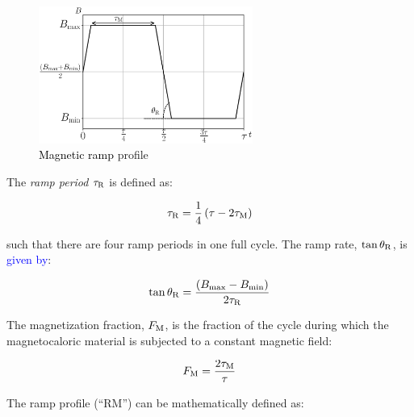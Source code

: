 \documentclass[referee]{svjour3}
\begin{document}
\begin{figure}[!ht]
  \centering
  \includegraphics[width=7cm]{Fig4-profile_rm}
  \caption{\textcolor{black}{Magnetic ramp}  profile}
  \label{fig:ramp}
\end{figure}

The \emph{ramp period} \(\tau_{\mathrm{R}}\) is defined as:

\begin{equation}
\label{eq:201}
\tau_{\mathrm{R}} = \frac{1}{4}\left(\tau - 2 \tau_{\mathrm{M}}\right)
\end{equation}

\noindent such that there are four ramp periods in one full cycle. The ramp rate, \(\tan \theta_{\mathrm{R}}\), is \textcolor{blue}{given by}:

\begin{equation}
\label{eq:202}
\tan \theta_{\mathrm{R}} = \frac{\left({B}_{\mathrm{max}} - {B}_{\mathrm{min}}\right)}{2\tau_{\mathrm{R}}}
\end{equation}


The magnetization fraction, \(F_{\mathrm{M}}\), is the fraction of the cycle during which the magnetocaloric material is subjected to a constant magnetic field:

\begin{equation}
\label{eq:204}
F_{\mathrm{M}} = \frac{2\tau_{\mathrm{M}}}{\tau}
\end{equation}


The ramp profile (``RM'') can be mathematically defined as:
\end{document}
